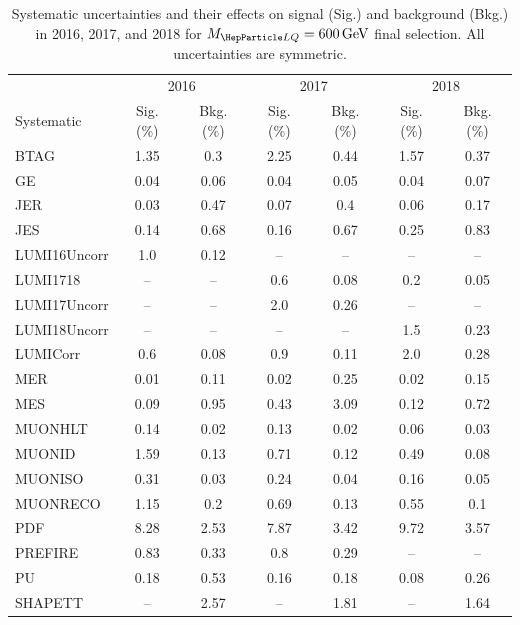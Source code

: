 \begin{table}[H]
	\begin{center}
        \begin{footnotesize}
			\caption{Systematic uncertainties and their effects on signal (Sig.) and background (Bkg.) in 2016, 2017, and 2018 for $\MLQ = \SI{600}{GeV}$ final selection. All uncertainties are symmetric.}
			\begin{tabular}{lcccccc} \hline \hline
				& \multicolumn{2}{c}{2016} & \multicolumn{2}{c}{2017} & \multicolumn{2}{c}{2018} \\
				Systematic & Sig. (\%) & Bkg. (\%) & Sig. (\%) & Bkg. (\%) & Sig. (\%) & Bkg. (\%) \\ \hline
				BTAG &  1.35  &  0.3 &  2.25  &  0.44 &  1.57  &  0.37 \\
				GE &  0.04  &  0.06 &  0.04  &  0.05 &  0.04  &  0.07 \\
				JER &  0.03  &  0.47 &  0.07  &  0.4 &  0.06  &  0.17 \\
				JES &  0.14  &  0.68 &  0.16  &  0.67 &  0.25  &  0.83 \\
				LUMI16Uncorr &  1.0  &  0.12 & -- & -- & -- & -- \\
				LUMI1718 & -- & -- &  0.6  &  0.08 &  0.2  &  0.05 \\
				LUMI17Uncorr & -- & -- &  2.0  &  0.26 & -- & -- \\
				LUMI18Uncorr & -- & -- & -- & -- &  1.5  &  0.23 \\
				LUMICorr &  0.6  &  0.08 &  0.9  &  0.11 &  2.0  &  0.28 \\
				MER &  0.01  &  0.11 &  0.02  &  0.25 &  0.02  &  0.15 \\
				MES &  0.09  &  0.95 &  0.43  &  3.09 &  0.12  &  0.72 \\
				MUONHLT &  0.14  &  0.02 &  0.13  &  0.02 &  0.06  &  0.03 \\
				MUONID &  1.59  &  0.13 &  0.71  &  0.12 &  0.49  &  0.08 \\
				MUONISO &  0.31  &  0.03 &  0.24  &  0.04 &  0.16  &  0.05 \\
				MUONRECO &  1.15  &  0.2 &  0.69  &  0.13 &  0.55  &  0.1 \\
				PDF &  8.28  &  2.53 &  7.87  &  3.42 &  9.72  &  3.57 \\
				PREFIRE &  0.83  &  0.33 &  0.8  &  0.29 & -- & -- \\
				PU &  0.18  &  0.53 &  0.16  &  0.18 &  0.08  &  0.26 \\
				SHAPETT & -- &  2.57 & -- &  1.81 & -- &  1.64 \\

\end{tabular}
\end{footnotesize}
\end{center}
\end{table}

